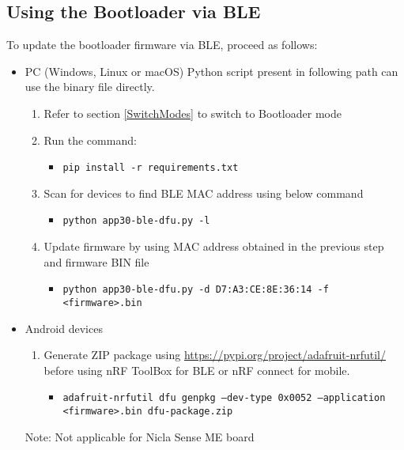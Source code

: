 \documentclass{article}
\begin{document}
\subsection{Using the Bootloader via BLE}
To update the bootloader firmware via BLE, proceed as follows:
\begin{itemize}
	\item PC (Windows, Linux or macOS)
	\newline Python script present in following path  can use the binary file directly.
	\begin{enumerate}[label=\roman*.]
		\item Refer to section \ref{SwitchModes} to switch to Bootloader mode
		\item Run the command:
		\begin{itemize}
			\item \texttt{pip install -r requirements.txt}
		\end{itemize} 
		\item Scan for devices to find BLE MAC address using below command
		\begin{itemize}
			\item \texttt{python app30-ble-dfu.py -l}
		\end{itemize} 
		\item Update firmware by using MAC address obtained in the previous step and firmware BIN file
		\begin{itemize}
			\item \texttt{python app30-ble-dfu.py -d D7:A3:CE:8E:36:14 -f <firmware>.bin}
		\end{itemize}
	\end{enumerate}
	\item Android devices
	\begin{enumerate}[label=\roman*.]
		\item Generate ZIP package using \url{https://pypi.org/project/adafruit-nrfutil/} before using nRF ToolBox for BLE or nRF connect for mobile.
		\begin{itemize}
			\item \texttt{adafruit-nrfutil dfu genpkg --dev-type 0x0052 --application <firmware>.bin dfu-package.zip}
		\end{itemize} 
	\end{enumerate}
Note: Not applicable for Nicla Sense ME board
\end{itemize}

\newpage
\end{document}

